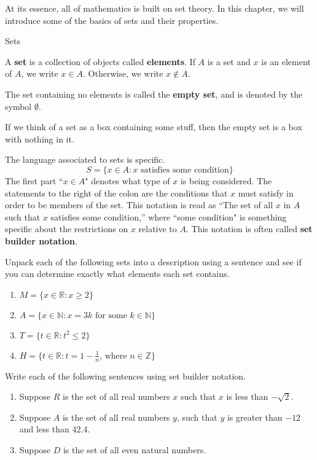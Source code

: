 
At its essence, all of mathematics is built on set theory.  In this chapter, we will introduce some of the basics of sets and their properties.

\begin{section}{Sets} 

\begin{definition}
A \textbf{set} is a collection of objects called \textbf{elements}. If $A$ is a set and $x$ is an element of $A$, we write
$x\in A$. Otherwise, we write $x\notin A$.
\end{definition}

\begin{definition}
The set containing no elements is called the \textbf{empty set}, and is denoted by the symbol $\emptyset$.
\end{definition}

If we think of a set as a box containing some stuff, then the empty set is a box with nothing in it.

\begin{definition} 
The language associated to sets is specific.  
\[
S=\{x \in A: x \mbox{ satisfies some condition}\}
\]
The first part ``$x \in A$" denotes what type of $x$ is being considered.  The statements to the right of the colon are the conditions that $x$ must satisfy in order to be members of the set.  This notation is read as ``The set of all $x$ in $A$ such that $x$ satisfies some condition,'' where ``some condition" is something specific about the restrictions on $x$ relative to $A$.  This notation is often called \textbf{set builder notation}.
\end{definition}

\begin{exercise}
Unpack each of the following sets into a description using a sentence and see if you can determine exactly what elements each set contains.
\begin{enumerate}
\item $M=\{x \in \mathbb{R} :  x \geq 2 \}$
\item $A=\{x \in \mathbb{N} : x = 3k \mbox{ for some } k\in \mathbb{N} \}$
\item $T=\{t \in \mathbb{R} : t^2 \leq 2 \}$
\item $H=\{t \in \mathbb{R} : t = 1 - \frac{1}{n} \mbox{, where } n \in \mathbb{Z} \}$
\end{enumerate}
\end{exercise}

\begin{exercise}
Write each of the following sentences using set builder notation.
\begin{enumerate}
\item Suppose $R$ is the set of all real numbers $x$ such that $x$ is less than $-\sqrt{2}$. 
\item Suppose $A$ is the set of all real numbers $y$, such that $y$ is greater than $-12$ and less than 42.4.
\item Suppose $D$ is the set of all even natural numbers.
\end{enumerate}
\end{exercise}


\end{section}
